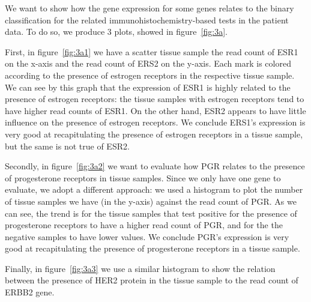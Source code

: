 \documentclass[10pt,twocolumn]{article}\usepackage[]{graphicx}\usepackage[]{color}
\begin{document}
We want to show how the gene expression for some genes relates to the binary classification for the related immunohistochemistry-based tests in the patient data. To do so, we produce 3 plots, showed in figure~\ref{fig:3a}.

First, in figure~\ref{fig:3a1} we have a scatter tissue sample the read count of ESR1 on the x-axis and the read count of ERS2 on the y-axis. Each mark is colored according to the presence of estrogen receptors in the respective tissue sample. We can see by this graph that the expression of ESR1 is highly related to the presence of estrogen receptors: the tissue samples with estrogen receptors tend to have higher read counts of ESR1. On the other hand, ESR2 appears to have little influence on the presence of estrogen receptors. We conclude ERS1's expression is very good at recapitulating the presence of estrogen receptors in a tissue sample, but the same is not true of ESR2.

Secondly, in figure~\ref{fig:3a2} we want to evaluate how PGR relates to the presence of progesterone receptors in tissue samples. Since we only have one gene to evaluate, we adopt a different approach: we used a histogram to plot the number of tissue samples we have (in the y-axis) against the read count of PGR. As we can see, the trend is for the tissue samples that test positive for the presence of progesterone receptors to have a higher read count of PGR, and for the the negative samples to have lower values.  We conclude PGR's expression is very good at recapitulating the presence of progesterone receptors in a tissue sample.

Finally, in figure~\ref{fig:3a3} we use a similar histogram to show the relation between the presence of HER2 protein in the tissue sample to the read count of ERBB2 gene.
\end{document}
